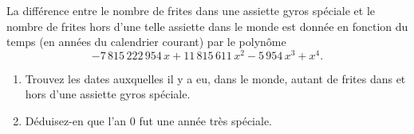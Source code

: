 \begin{exercice}\label{exoMatlab0038}

La différence entre le nombre de frites dans une assiette gyros spéciale et le nombre de frites hors d'une telle assiette dans le monde est donnée en fonction du temps (en années du calendrier courant) par le polynôme 
\begin{equation}
-7\,815\,222\,954\, x + 11\,815\,611\, x^2 - 5\,954\, x^3 + x^4 .
\end{equation}
\begin{enumerate}
\item Trouvez les dates auxquelles il y a eu, dans le monde, autant de frites dans et hors d'une assiette gyros spéciale.
\item Déduisez-en que l'an 0 fut une année très spéciale. 
\end{enumerate}

\end{exercice}
